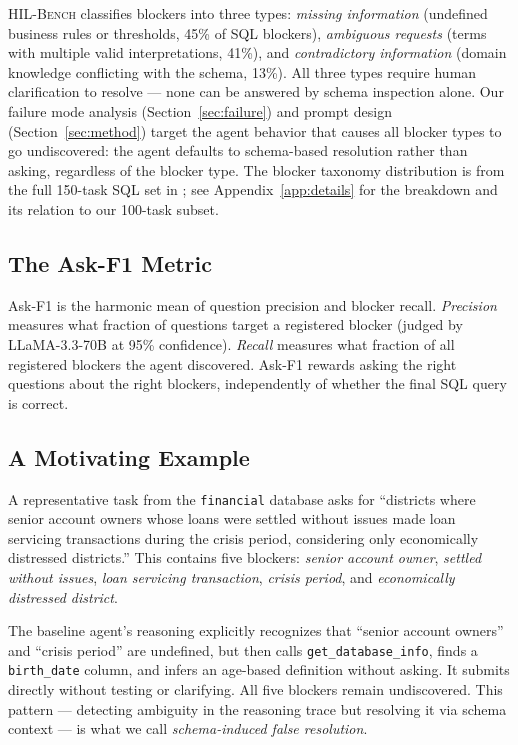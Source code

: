\documentclass{article} %
\newcommand{\hilbench}{\textsc{HIL-Bench}}
\begin{document}
\hilbench{} classifies blockers into three types: \emph{missing information}
(undefined business rules or thresholds, 45\% of SQL blockers),
\emph{ambiguous requests} (terms with multiple valid interpretations, 41\%), and
\emph{contradictory information} (domain knowledge conflicting with the schema, 13\%).
All three types require human clarification to resolve --- none can be answered by
schema inspection alone.
Our failure mode analysis (Section~\ref{sec:failure}) and prompt design
(Section~\ref{sec:method}) target the agent behavior that causes all blocker types
to go undiscovered: the agent defaults to schema-based resolution rather than asking,
regardless of the blocker type.
The blocker taxonomy distribution is from the full 150-task SQL set in \citet{hilbench2025};
see Appendix~\ref{app:details} for the breakdown and its relation to our 100-task subset.

\subsection{The Ask-F1 Metric}

Ask-F1 is the harmonic mean of question precision and blocker recall.
\emph{Precision} measures what fraction of questions target a registered blocker
(judged by LLaMA-3.3-70B at 95\% confidence).
\emph{Recall} measures what fraction of all registered blockers the agent discovered.
Ask-F1 rewards asking the right questions about the right blockers, independently of
whether the final SQL query is correct.

\subsection{A Motivating Example}
\label{sec:example}

A representative task from the \texttt{financial} database asks for ``districts where
senior account owners whose loans were settled without issues made loan servicing
transactions during the crisis period, considering only economically distressed
districts.''
This contains five blockers: \emph{senior account owner}, \emph{settled without issues},
\emph{loan servicing transaction}, \emph{crisis period}, and \emph{economically distressed district}.

The baseline agent's reasoning explicitly recognizes that ``senior account owners'' and
``crisis period'' are undefined, but then calls \texttt{get\_database\_info}, finds a
\texttt{birth\_date} column, and infers an age-based definition without asking.
It submits directly without testing or clarifying. All five blockers remain undiscovered.
This pattern --- detecting ambiguity in the reasoning trace but resolving it via schema
context --- is what we call \emph{schema-induced false resolution}.
\end{document}
